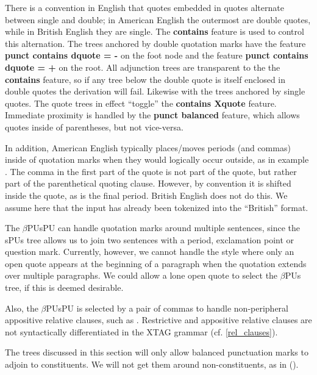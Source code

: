 There is a convention in English that quotes embedded in quotes
alternate between single and double; in American English the outermost
are double quotes, while in British English they are single.  The {\bf
contains} feature is used to control this alternation. The trees
anchored by double quotation marks have the feature {\bf punct
contains dquote = -} on the foot node and the feature {\bf punct
contains dquote = +} on the root. All adjunction trees are transparent
to the the {\bf contains} feature, so if any tree below the double
quote is itself enclosed in double quotes the derivation will
fail. Likewise with the trees anchored by single quotes. The quote
trees in effect ``toggle'' the {\bf contains Xquote}
feature. Immediate proximity is handled by the {\bf punct balanced}
feature, which allows quotes inside of parentheses, but not vice-versa.

In addition, American English typically places/moves periods (and
commas) inside of quotation marks when they would logically occur
outside, as in example
. The comma in the first part of the quote is not part of the
quote, but rather part of the parenthetical quoting clause. However,
by convention it is shifted inside the quote, as is the final
period. British English does not do this. We assume here that the
input has already been tokenized into the ``British'' format.


The $\beta$PUsPU can handle quotation marks around multiple sentences,
since the sPUs tree allows us to join two sentences with a period,
exclamation point or question mark. Currently, however, we cannot
handle the style where only an open quote appears at the beginning of
a paragraph when the quotation extends over multiple
paragraphs. We could allow a lone open quote to select the $\beta$PUs
tree, if this is deemed desirable.

Also, the $\beta$PUsPU is selected by a pair of commas to handle
non-peripheral appositive relative clauses, such as
. Restrictive and appositive relative clauses are not
syntactically differentiated in the XTAG grammar
(cf. \ref{rel_clauses}).


The trees discussed in this section will only allow balanced
punctuation marks to adjoin to constituents. We will not get them
around non-constituents, as in ().

